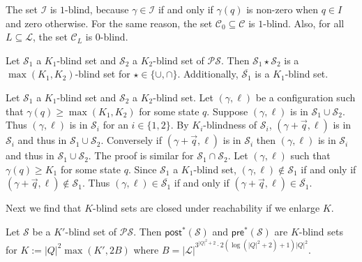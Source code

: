 \documentclass[10pt,a4paper]{article}
\renewcommand{\ge}{\geqslant}
\newcommand{\set}[1]{\{#1\}}
\newcommand{\size}[1]{|#1|}
\newcommand{\config}{\gamma}
\newcommand{\initialconfigs}{\mathcal{I}}
\newcommand{\preop}{\mathsf{pre}}
\newcommand{\postop}{\mathsf{post}}
\newcommand{\prestar}[1]{\preop^*(#1)}
\newcommand{\poststar}[1]{\postop^*(#1)}
\newcommand*{\states}{Q}
\newcommand{\cSet}{\mathcal{S}}  %
\newcommand{\bstates}{\mathcal{L}}
\newcommand*{\abuchistate}{\ell}
\newcommand*{\bstate}{\abuchistate}
\newcommand{\prodsystem}{\mathcal{PS}}
\newcommand{\prodconfigs}{\mathcal{C}}
\newcommand{\prodconfigsproj}[1]{\prodconfigs_{#1}}
\newcommand{\prodinitialconfigs}{\prodconfigs_0}
\newcommand*{\setcomplement}[1]{\overline{#1}}
\begin{document}
\begin{example}
	\label{ex:initial-and-winning}
	The set \(\initialconfigs\) is \(1\)-blind, because \(\config \in \initialconfigs\) if and only if \(\config(q)\) is non-zero when \(q\in I\) and zero otherwise.
	For the same reason, the set \(\prodinitialconfigs \subseteq \prodconfigs\) is \(1\)-blind.
	Also, for all \(L \subseteq \bstates\), the set \(\prodconfigsproj{L}\) is \(0\)-blind.
\end{example}

%

\begin{lemmarep}
	\label{lm:k-blind-boolean}
	Let \(\cSet_1\) a \(K_1\)-blind set and \(\cSet_2\) a \(K_2\)-blind set of \(\prodsystem\).
	Then \(\cSet_1 \star \cSet_2\) is a \(\max(K_1,K_2)\)-blind set for \(\star \in \set{\cup, \cap}\).
	Additionally, \(\setcomplement{\cSet_1}\) is a \(K_1\)-blind set.
\end{lemmarep}
\begin{appendixproof}
	Let \(\cSet_1\) a \(K_1\)-blind set and \(\cSet_2\) a \(K_2\)-blind set.
	Let \((\config,\bstate)\) be a configuration such that \(\config(q) \ge \max(K_1,K_2)\) for some state \(q\).
	Suppose \((\config,\bstate)\) is in \(\cSet_1 \cup \cSet_2\).
	Thus \((\config,\bstate)\) is in \(\cSet_i\) for an \(i \in \set{1,2}\).
	By \(K_i\)-blindness of \(\cSet_i\), \((\config+\vec{q},\bstate)\) is in \(\cSet_i\) and thus in \(\cSet_1 \cup \cSet_2\).
	Conversely if \((\config+\vec{q},\bstate)\) is in \(\cSet_i\) then \((\config,\bstate)\) is in \(\cSet_i\) and thus in \(\cSet_1 \cup \cSet_2\).
	The proof is similar for \(\cSet_1 \cap \cSet_2\).
	Let \((\config,\bstate)\) such that \(\config(q) \ge K_1\) for some state \(q\).
	Since \(\cSet_1\) a \(K_1\)-blind set, \((\config,\bstate) \notin \cSet_1\) if and only if \((\config+\vec{q},\bstate) \notin \cSet_1\).
	Thus \((\config,\bstate) \in \overline{\cSet_1}\) if and only if \((\config+\vec{q},\bstate) \in \overline{\cSet_1}\).
\end{appendixproof}

Next we find that \(K\)-blind sets are closed under reachability if we enlarge \(K\).
%

\begin{theorem}%
	\label{thm:k-blind-post}
	Let \(\cSet\) be a \(K'\)-blind set of \(\prodsystem\).
	Then \(\poststar{\cSet}\) and \(\prestar{\cSet}\) are \(K\)-blind sets for \(K := \size{\states}^2 \max(K', 2 B)\) where \(B = \size{\bstates}^{3^{\size{\states}^2+2} \cdot 2(\log(\size{\states}^2+2) +1) \size{\states}^2}\).
\end{theorem}
\end{document}
